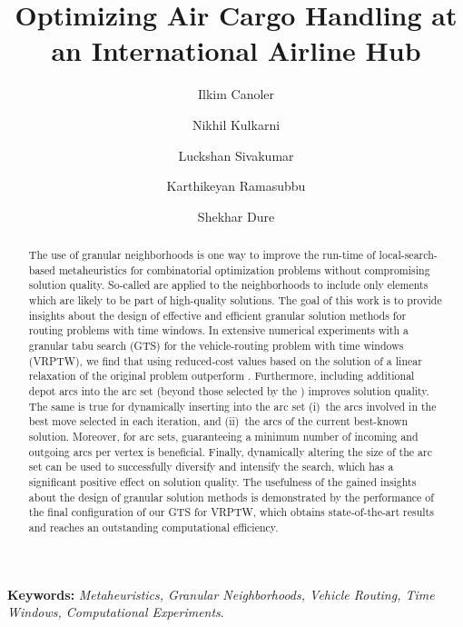 \documentclass[11pt,a4paper,fleqn]{article}
\begin{document}
\onehalfspacing
\title{Optimizing Air Cargo Handling at an International Airline Hub} 
\author{Ilkim Canoler \and Nikhil Kulkarni \and  Luckshan Sivakumar \and Karthikeyan Ramasubbu \and Shekhar Dure }
\date{}
\maketitle

\begin{abstract}
The use of granular neighborhoods is one way to improve the run-time of local-search-based metaheuristics for combinatorial optimization problems without compromising solution quality. So-called \smslong are applied to \reduceX the neighborhoods to include only elements which are likely to be part  of high-quality solutions. The goal of this work is to provide insights about the design of effective and efficient granular solution methods for routing problems with time windows. In extensive numerical experiments with a granular tabu search (GTS) for the vehicle-routing problem with time windows (VRPTW),  we find that \smslong using reduced-cost values based on the solution of a linear relaxation of the original problem outperform \standardSMS \smslong. %
Furthermore, including additional depot arcs into the \reduced arc set (beyond those selected by the \smlong) improves solution quality. The same is true for dynamically inserting into the \reduced arc set (i)~the arcs involved in the best move selected in each iteration, and (ii)~the arcs of the current best-known solution. Moreover, for \stronglyreduced arc sets,  guaranteeing a minimum number of incoming and outgoing arcs per vertex is beneficial. Finally, dynamically altering the size of the \reduced arc set can be used to successfully diversify and intensify the search, which has a significant positive effect on solution quality. The usefulness of the gained insights about the design of granular solution methods is demonstrated by the performance of the final configuration of our GTS for VRPTW, which obtains state-of-the-art results and reaches an outstanding computational efficiency. 

\end{abstract}
\textbf{Keywords:} \textit{Metaheuristics,
	Granular Neighborhoods,
	Vehicle Routing,
	Time Windows,
	Computational Experiments}.

\newpage
\end{document}
